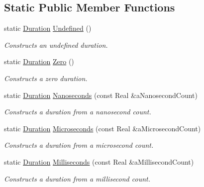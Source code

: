 \subsection*{Static Public Member Functions}
\begin{DoxyCompactItemize}
\item 
static \hyperlink{classlibrary_1_1physics_1_1time_1_1_duration}{Duration} \hyperlink{classlibrary_1_1physics_1_1time_1_1_duration_a67012781d9b7491e26bdc3da9f513130}{Undefined} ()
\begin{DoxyCompactList}\small\item\em Constructs an undefined duration. \end{DoxyCompactList}\item 
static \hyperlink{classlibrary_1_1physics_1_1time_1_1_duration}{Duration} \hyperlink{classlibrary_1_1physics_1_1time_1_1_duration_aa68c3998cd4cf9068fb239dd66102c2c}{Zero} ()
\begin{DoxyCompactList}\small\item\em Constructs a zero duration. \end{DoxyCompactList}\item 
static \hyperlink{classlibrary_1_1physics_1_1time_1_1_duration}{Duration} \hyperlink{classlibrary_1_1physics_1_1time_1_1_duration_a6a629b2275337fbadac912cc9364a9f1}{Nanoseconds} (const Real \&a\+Nanosecond\+Count)
\begin{DoxyCompactList}\small\item\em Constructs a duration from a nanosecond count. \end{DoxyCompactList}\item 
static \hyperlink{classlibrary_1_1physics_1_1time_1_1_duration}{Duration} \hyperlink{classlibrary_1_1physics_1_1time_1_1_duration_a9082d43579a99fd667b0080de8adf8ed}{Microseconds} (const Real \&a\+Microsecond\+Count)
\begin{DoxyCompactList}\small\item\em Constructs a duration from a microsecond count. \end{DoxyCompactList}\item 
static \hyperlink{classlibrary_1_1physics_1_1time_1_1_duration}{Duration} \hyperlink{classlibrary_1_1physics_1_1time_1_1_duration_ab6eab798898a96019a8c944cd565e161}{Milliseconds} (const Real \&a\+Millisecond\+Count)
\begin{DoxyCompactList}\small\item\em Constructs a duration from a millisecond count. \end{DoxyCompactList}\item 

\end{DoxyCompactItemize}
